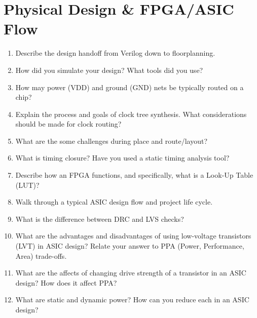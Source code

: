 \documentclass[11pt]{article}
\begin{document}
\section{Physical Design \& FPGA/ASIC Flow}
\begin{enumerate}
    \item Describe the design handoff from Verilog down to floorplanning.
    \item How did you simulate your design? What tools did you use?
    \item How may power (VDD) and ground (GND) nets be typically routed on a chip?
    \item Explain the process and goals of clock tree synthesis. What considerations should be made for clock
    routing?
    \item What are the some challenges during place and route/layout?
    \item What is timing closure? Have you used a static timing analysis tool?
    \item Describe how an FPGA functions, and specifically, what is a Look-Up
    Table (LUT)?
    \item Walk through a typical ASIC design flow and project life cycle.
    \item What is the difference between DRC and LVS checks?
    \item What are the advantages and disadvantages of using low-voltage transistors (LVT) in ASIC design? Relate your answer to PPA (Power, Performance, Area) trade-offs.
    \item What are the affects of changing drive strength of a transistor in an ASIC design? How does it affect PPA?
    \item What are static and dynamic power? How can you reduce each in an ASIC design?
\end{enumerate}

\end{document}
